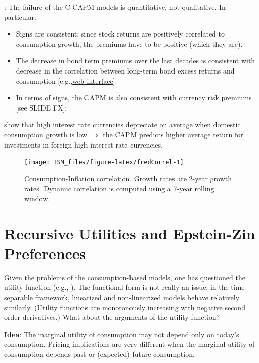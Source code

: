 \documentclass[
  12pt,
]{book}
\providecommand{\tightlist}{%
  \setlength{\itemsep}{0pt}\setlength{\parskip}{0pt}}
\theoremstyle{definition}
\theoremstyle{definition}
\theoremstyle{definition}
\theoremstyle{definition}
\theoremstyle{remark}
\begin{document}
\citet{Cochrane_2005}: The failure of the C-CAPM models is quantitative, not qualitative. In particular:

\begin{itemize}
\tightlist
\item
  Signs are consistent: since stock returns are positively correlated to consumption growth, the premiums have to be positive (which they are).
\item
  The decrease in bond term premiums over the last decades is consistent with decrease in the correlation between long-term bond excess returns and consumption {[}e.g.,\href{https://jrenne.shinyapps.io/APModels}{web interface}{]}.
\item
  In terms of signs, the CAPM is also consistent with currency risk premiums {[}see SLIDE FX{]}:
\end{itemize}

\citet{Lustig_Verdelhan_2007} show that high interest rate currencies depreciate on average when domestic consumption growth is low \(\Rightarrow\) the CAPM predicts higher average return for investments in foreign high-interest rate currencies.

\begin{figure}
\texttt{[image: TSM\_files/figure-latex/fredCorrel-1]} \caption{Consumption-Inflation correlation. Growth rates are 2-year growth rates. Dynamic correlation is computed using a 7-year rolling window.}\label{fig:fredCorrel}
\end{figure}

\hypertarget{recursive-utilities-and-epstein-zin-preferences}{%
\section{Recursive Utilities and Epstein-Zin Preferences}\label{recursive-utilities-and-epstein-zin-preferences}}

Given the problems of the consumption-based models, one has questioned the utility function (e.g., \citet{Cochrane_2005}). The functional form is not really an issue: in the time-separable framework, linearized and non-linearized models behave relatively similarly. (Utility functions are monotonously increasing with negative second order derivatives.) What about the arguments of the utility function?

\textbf{Idea}: The marginal utility of consumption may not depend only on today's consumption. Pricing implications are very different when the marginal utility of consumption depends past or (expected) future consumption.
\end{document}
